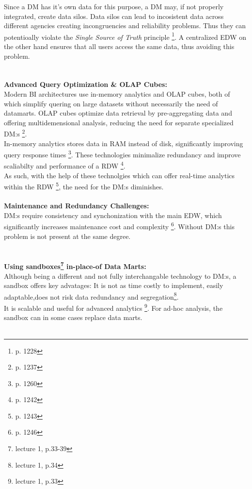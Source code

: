 Since a DM has it's own data for this purpose, a DM may, if not properly integrated, create data silos.
Data silos can lead to incosistent data across different agencies creating incongruencies and reliability problems.
Thus they can potentioally violate the \textit{Single Source of Truth} principle \footnote{p. 1228}.
A centralized EDW on the other hand ensures that all users access the same data, thus avoiding this problem.
\\\\
\\\textbf{\color{red}{THIS TEXT NEEDS TO BE REWRITTEN OR REMOVED. IT IS NOT HELPFUL HERE GIVEN HIS LECTURE VIDEO (!= LECTURE PP)}}
\textbf{Advanced Query Optimization \& OLAP Cubes:}\\
Modern BI architectures use in-memory analytics and OLAP cubes, both of which simplify quering on large datasets without necessarily the need of datamarts.
OLAP cubes optimize data retrieval by pre-aggregating data and offering multidemensional analysis, reducing the need for separate specialized DM:s \footnote{p. 1237}.\\
In-memory analytics stores data in RAM instead of disk, significantly improving query response times \footnote{p. 1260}.
These technologies minimalize redundancy and improve scaliabilty and performance of a RDW \footnote{p. 1242}.
\\ As such, with the help of these technolgies which can offer real-time analytics within the RDW \footnote{p. 1243}, the need for the DM:s diminishes.
\\\\\textbf{Maintenance and Redundancy Challenges:}\\
DM:s require consistency and synchonization with the main EDW, which significantly increases maintenance cost and complexity \footnote{p. 1246}.
Without DM:s this problem is not present at the same degree.
\\\\\textbf{\color{red}{MOVE THIS PART BELOW AWAY FROM HERE TO SANDBOX PART? THEY ARE DIFFERENT FROM DATAMARTS, ALTHOUGH THEY CAN COMPLIMENT THEM. HARD TO MOTIVATE...}}
\\\textbf{Using sandboxes\footnote{lecture 1, p.33-39} in-place-of Data Marts:}\\
Although being a different and not fully interchangable technology to DM:s, a sandbox offers key advatages:
It is not as time costly to implement, easily adaptable,does not risk data redundancy and segregation\footnote{lecture 1, p.34}.\\
It is scalable and useful for advanced analytics \footnote{lecture 1, p.33}.
For ad-hoc analysis, the sandbox can in some cases replace data marts.\\\\


